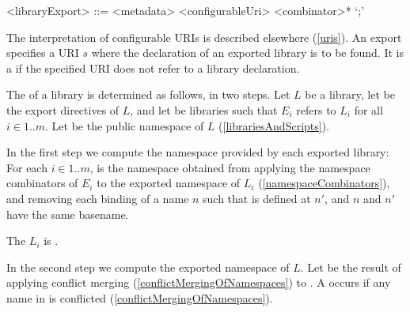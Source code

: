 \documentclass[makeidx]{article}
\begin{document}
{\begin{grammar}
<libraryExport> ::= <metadata> \EXPORT{} <configurableUri> <combinator>* `;'
\end{grammar}

\LMHash{}%
The interpretation of configurable URIs is described elsewhere
(\ref{uris}).
An export specifies a URI $s$
where the declaration of an exported library is to be found.
It is a  if the specified URI
does not refer to a library declaration.

\LMHash{}%
The
of a library is determined as follows, in two steps.
Let $L$ be a library,
let  be the export directives of $L$,
and let  be libraries
such that $E_i$ refers to $L_i$ for all $i \in 1 .. m$.
Let  be the public namespace of $L$
(\ref{librariesAndScripts}).


\LMHash{}%
In the first step we compute the namespace provided by each exported library:
For each $i \in 1 .. m$,
 is
the namespace obtained from applying
the namespace combinators of $E_i$ to
the exported namespace of $L_i$
(\ref{namespaceCombinators}),
and removing each binding of a name $n$ such that
 is defined at $n'$,
and $n$ and $n'$ have the same basename.

\LMHash{}%
The
$L_i$ is .

\LMHash{}%
In the second step we compute the exported namespace of $L$.
Let  be the result of applying
conflict merging
(\ref{conflictMergingOfNamespaces})
to .
A  occurs if any name in
is conflicted
(\ref{conflictMergingOfNamespaces}).


}
\end{document}
